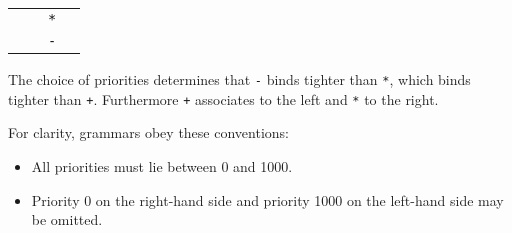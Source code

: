 \begin{isabellebody}
\begin{isamarkuptext}
\begin{center}
\begin{tabular}{rclr}
  \isa{{\isaliteral{22}{\isachardoublequote}}A\isaliteral{5C3C5E7375703E}{}\isactrlsup {\isaliteral{28}{\isacharparenleft}}\isaliteral{5C3C5E7375703E}{}\isactrlsup {\isadigit{2}}\isaliteral{5C3C5E7375703E}{}\isactrlsup {\isaliteral{29}{\isacharparenright}}{\isaliteral{22}{\isachardoublequote}}} & \isa{{\isaliteral{22}{\isachardoublequote}}{\isaliteral{3D}{\isacharequal}}{\isaliteral{22}{\isachardoublequote}}} & \isa{{\isaliteral{22}{\isachardoublequote}}A\isaliteral{5C3C5E7375703E}{}\isactrlsup {\isaliteral{28}{\isacharparenleft}}\isaliteral{5C3C5E7375703E}{}\isactrlsup {\isadigit{3}}\isaliteral{5C3C5E7375703E}{}\isactrlsup {\isaliteral{29}{\isacharparenright}}{\isaliteral{22}{\isachardoublequote}}} \verb|*| \isa{{\isaliteral{22}{\isachardoublequote}}A\isaliteral{5C3C5E7375703E}{}\isactrlsup {\isaliteral{28}{\isacharparenleft}}\isaliteral{5C3C5E7375703E}{}\isactrlsup {\isadigit{2}}\isaliteral{5C3C5E7375703E}{}\isactrlsup {\isaliteral{29}{\isacharparenright}}{\isaliteral{22}{\isachardoublequote}}} \\
  \isa{{\isaliteral{22}{\isachardoublequote}}A\isaliteral{5C3C5E7375703E}{}\isactrlsup {\isaliteral{28}{\isacharparenleft}}\isaliteral{5C3C5E7375703E}{}\isactrlsup {\isadigit{3}}\isaliteral{5C3C5E7375703E}{}\isactrlsup {\isaliteral{29}{\isacharparenright}}{\isaliteral{22}{\isachardoublequote}}} & \isa{{\isaliteral{22}{\isachardoublequote}}{\isaliteral{3D}{\isacharequal}}{\isaliteral{22}{\isachardoublequote}}} & \verb|-| \isa{{\isaliteral{22}{\isachardoublequote}}A\isaliteral{5C3C5E7375703E}{}\isactrlsup {\isaliteral{28}{\isacharparenleft}}\isaliteral{5C3C5E7375703E}{}\isactrlsup {\isadigit{3}}\isaliteral{5C3C5E7375703E}{}\isactrlsup {\isaliteral{29}{\isacharparenright}}{\isaliteral{22}{\isachardoublequote}}} \\
  \end{tabular}
  \end{center}
  The choice of priorities determines that \verb|-| binds
  tighter than \verb|*|, which binds tighter than \verb|+|.  Furthermore \verb|+| associates to the left and
  \verb|*| to the right.

  \medskip For clarity, grammars obey these conventions:
  \begin{itemize}

  \item All priorities must lie between 0 and 1000.

  \item Priority 0 on the right-hand side and priority 1000 on the
  left-hand side may be omitted.


\end{itemize}
\end{isamarkuptext}
\end{isabellebody}
